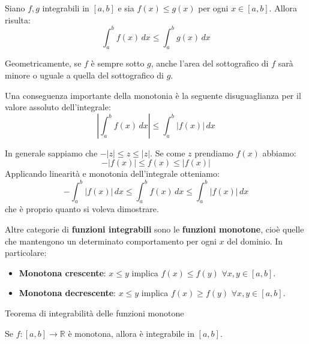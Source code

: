 \documentclass[12pt]{report}
\begin{document}
	\begin{proposizione}{}{}
		
		Siano $f, g$ integrabili in $[a, b]$ e sia $f(x) \leq g(x)$ per ogni $x \in [a, b]$.
		Allora risulta:
		\[
		\int_a^b f(x) \, dx \leq \int_a^b g(x) \, dx
		\]
		
	\end{proposizione}
	
	Geometricamente, se $f$ è sempre sotto $g$, anche l'area del sottografico di $f$ sarà minore o uguale a quella del sottografico di $g$.
	
	Una conseguenza importante della monotonia è la seguente disuguaglianza per il valore assoluto dell'integrale:
	\[
	\left| \int_a^b f(x) \, dx \right| \leq \int_a^b |f(x)| \, dx
	\]
	
	\begin{dimostrazione}{}{}
		
		In generale sappiamo che $-|z| \leq z \leq |z|$. Se come $z$ prendiamo $f(x)$ abbiamo:
		\[
		-|f(x)| \leq f(x) \leq |f(x)|
		\]
		Applicando linearità e monotonia dell'integrale otteniamo:
		\[
		-\int_a^b |f(x)| \, dx \leq \int_a^b f(x) \, dx \leq \int_a^b |f(x)| \, dx
		\]
		che è proprio quanto si voleva dimostrare.
		
	\end{dimostrazione}
	
	Altre categorie di \textbf{funzioni integrabili} sono le \textbf{funzioni monotone}, cioè quelle che mantengono un determinato comportamento per ogni $x$ del dominio. In particolare:
	\begin{itemize}
		
		\item \textbf{Monotona crescente}: $x \leq y$ implica $f(x) \leq f(y)$ $\forall x, y \in [a, b]$.
		
		\item \textbf{Monotona decrescente}: $x \leq y$ implica $f(x) \geq f(y)$ $\forall x, y \in [a, b]$.
		
	\end{itemize}
	
	\begin{teorema}{Teorema di integrabilità delle funzioni monotone}{}
		
		Se $f: [a, b] \to \mathbb{R}$ è monotona, allora è integrabile in $[a, b]$.
		
	\end{teorema}
	
\end{document}
